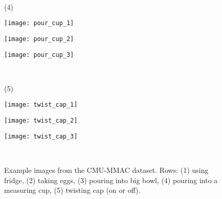 \documentclass[10pt,twocolumn,letterpaper]{article}
\begin{document}
\begin{figure}[tb!]
\begin{minipage}[b]{.31\columnwidth}
\smallskip
\end{minipage}\\
\begin{minipage}[b]{.02\columnwidth}
  \centering
  \centerline{\small{(4)}} \smallskip
\end{minipage}
\hfill
\begin{minipage}[b]{.31\columnwidth}
  \centering
  \centerline{\texttt{[image: pour\_cup\_1]}}
\smallskip
\end{minipage}
\hfill
\begin{minipage}[b]{.31\columnwidth}
  \centering
  \centerline{\texttt{[image: pour\_cup\_2]}}
\smallskip
\end{minipage}
\hfill
\begin{minipage}[b]{.31\columnwidth}
  \centering
  \centerline{\texttt{[image: pour\_cup\_3]}}
\smallskip
\end{minipage}\\
\begin{minipage}[b]{.02\columnwidth}
  \centering
  \centerline{\small{(5)}} \smallskip
\end{minipage}
\hfill
\begin{minipage}[b]{.31\columnwidth}
  \centering
  \centerline{\texttt{[image: twist\_cap\_1]}}
\smallskip
\end{minipage}
\hfill
\begin{minipage}[b]{.31\columnwidth}
  \centering
  \centerline{\texttt{[image: twist\_cap\_2]}}
\smallskip
\end{minipage}
\hfill
\begin{minipage}[b]{.31\columnwidth}
  \centering
  \centerline{\texttt{[image: twist\_cap\_3]}}
\smallskip
\end{minipage} \\
\vspace{-0.4cm}
\caption{{\small{Example images from the CMU-MMAC dataset. Rows: (1) using fridge, (2) taking eggs, (3) pouring into big bowl, (4) pouring into a measuring cup, (5) twisting cap (on or off).}}}
\label{fig:expImages}
\vspace{-0.35cm}
\end{figure}
\end{document}
